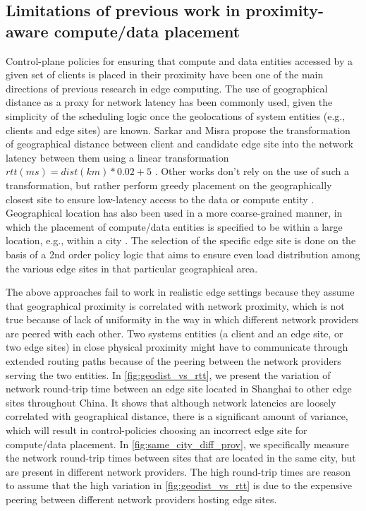 \subsection{Limitations of previous work in proximity-aware compute/data placement}
Control-plane policies for ensuring that compute and data entities accessed by a given set of clients is placed in their proximity have been one of the main directions of previous research in edge computing. The use of geographical distance as a proxy for network latency has been commonly used, given the simplicity of the scheduling logic once the geolocations of system entities (e.g., clients and edge sites) are known. Sarkar and Misra \cite{sarkar2016theoretical} propose the transformation of geographical distance between client and candidate edge site into the network latency between them using a linear transformation $rtt\left(ms\right) = dist \left(km\right) * 0.02 + 5$ \cite{qureshi2010power}. Other works don't rely on the use of such a transformation, but rather perform greedy placement on the geographically closest site to ensure low-latency access to the data or compute entity \cite{lahderanta2021edge}. Geographical location has also been used in a more coarse-grained manner, in which the placement of compute/data entities is specified to be within a large location, e.g., within a city \cite{vilaccageolocate}. The selection of the specific edge site is done on the basis of a 2nd order policy logic that aims to ensure even load distribution among the various edge sites in that particular geographical area.
\par The above approaches fail to work in realistic edge settings because they assume that geographical proximity is correlated with network proximity, which is not true because of lack of uniformity in the way in which different network providers are peered with each other. Two systems entities (a client and an edge site, or two edge sites) in close physical proximity might have to communicate through extended routing paths because of the peering between the network providers serving the two entities. In \cref{fig:geodist_vs_rtt}, we present the variation of network round-trip time between an edge site located in Shanghai to other edge sites throughout China. It shows that although network latencies are loosely correlated with geographical distance, there is a significant amount of variance, which will result in control-policies choosing an incorrect edge site for compute/data placement. In \cref{fig:same_city_diff_prov}, we specifically measure the network round-trip times between sites that are located in the same city, but are present in different network providers. The high round-trip times are reason to assume that the high variation in \cref{fig:geodist_vs_rtt} is due to the expensive peering between different network providers hosting edge sites. 
